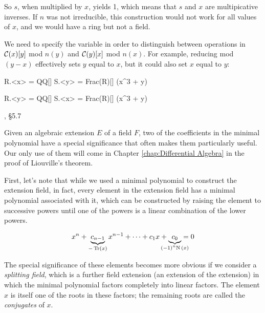 So $s$, when multiplied by $x$, yields 1, which means
that $s$ and $x$ are multipicative inverses.
If $n$ was not irreducible, this construction would
not work for all values of $x$, and we would have
a ring but not a field.

We need to specify the variable in order to distinguish between
operations in ${\cal C}(x)[y]$ mod $n(y)$ and ${\cal C}(y)[x]$
mod $n(x)$.  For example, reducing mod $(y-x)$ effectively sets
$y$ equal to $x$, but it could also set $x$ equal to $y$:

\begin{sageblock}
R.<x> = QQ[]
S.<y> = Frac(R)[]
(x^3 + y) %
\end{sageblock}

\begin{sageblock}
R.<y> = QQ[]
S.<x> = Frac(R)[]
(x^3 + y) %
\end{sageblock}


\begin{comment}
Again, like with the fraction field, I tend to be a bit loose with the
notation.  Something like the Gaussian integers, which I wrote as
${\bf Z}[i]; i^2=-1$, really should be expressed as equivalence
classes modulo the polynomial $i^2+1$, i.e.  ${\bf Z}[i]/(i^2+1)$.
\end{comment}

\vfill\eject
{}
, \S5.7

Given an algebraic extension $E$ of a field $F$, two of the
coefficients in the minimal polynomial have a special significance
that often makes them particularly useful.  Our only use of them will
come in Chapter \ref{chap:Differential Algebra} in the proof of Liouville's theorem.


First, let's note that while we used a minimal polynomial to
construct the extension field,
in fact, every element in the extension field
has a minimal polynomial associated with it,
which can be constructed by raising the element to successive
powers until one of the powers is a linear combination
of the lower powers.

\begin{key point}
\huge
\begin{equation*}
x^n + \underbrace{c_{n-1}}_{- \Tr(x)} x^{n-1} + \cdots + c_1 x + \underbrace{c_0}_{\mathclap{(-1)^n \N(x)}} = 0
\end{equation*}
\end{key point}

The special significance of these elements becomes more obvious if we
consider a {\it splitting field}, which is a further field extension
(an extension of the extension) in which the minimal polynomial
factors completely into linear factors.  The element $x$ is
itself one of the roots in these factors; the remaining
roots are called the {\it conjugates} of $x$.

